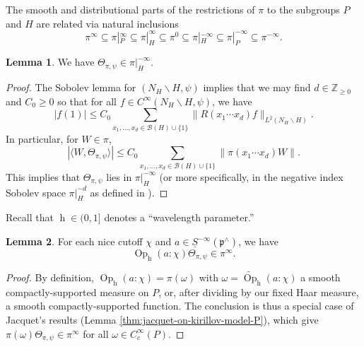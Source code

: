 \documentclass[reqno]{amsart}
\DeclareMathOperator{\h}{h}
\DeclareMathOperator{\Opp}{Op}
\theoremstyle{plain} \newtheorem{theorem} {Theorem}
\theoremstyle{definition} \newtheorem{definition} [theorem] {Definition}
\theoremstyle{itplain} %
\newtheorem{lemma}[theorem]{Lemma}
\numberwithin{equation}{section}
\numberwithin{theorem}{section}
\renewcommand{\geq}{\geqslant}
\renewcommand{\leq}{\leqslant}
\begin{document}
The smooth and distributional parts of the restrictions of $\pi$ to the subgroups $P$ and $H$ are related via natural inclusions
\begin{equation*}
  \pi^\infty \subseteq \pi|_P^\infty \subseteq \pi|_H^\infty \subseteq \pi ^0  \subseteq \pi|_H^{-\infty}
  \subseteq \pi|_P^{-\infty} \subseteq \pi^{-\infty}.
\end{equation*}
\begin{lemma}
  We have $\Theta_{\pi,\psi} \in \pi|_H^{-\infty}$.
\end{lemma}
\begin{proof}
  The Sobolev lemma for $(N_H \backslash H,\psi)$ implies that we may find $d \in \mathbb{Z}_{\geq 0}$ and $C_0 \geq 0$ so that for all $f \in C^\infty(N_H \backslash H, \psi)$, we have
  \begin{equation*}
    |f(1)| \leq C_0 \sum _{x_1, \dotsc, x_d \in \mathcal{B}(H) \cup \{1\}} \|R(x_1 \dotsb x_d) f\|_{L^2(N_H \backslash H)}.
  \end{equation*}
  In particular, for $W \in \pi$,
  \begin{equation*}
    |\langle W, \Theta_{\pi,\psi} \rangle| \leq C_0  \sum _{x_1, \dotsc, x_d \in \mathcal{B}(H) \cup \{1\}} \|\pi(x_1 \dotsb x_d) W\|.
  \end{equation*}
  This implies that $\Theta_{\pi,\psi}$ lies in $\pi|_H^{-\infty}$ (or more specifically, in the negative index Sobolev space $\pi|_H^{-d}$ as defined in \cite[\S3.2]{nelson-venkatesh-1}).
\end{proof}

Recall that $\h \in (0,1]$ denotes a ``wavelength parameter.''

\begin{lemma}
  For each nice cutoff $\chi$ and $a \in \underline{S}^{-\infty}(\mathfrak{p}^\wedge)$, we have
  \begin{equation*}
    \Opp_{\h}(a:\chi) \Theta_{\pi,\psi} \in \pi^\infty.
  \end{equation*}
\end{lemma}
\begin{proof}
  By definition, $\Opp_{\h}(a:\chi) = \pi(\omega)$ with $\omega = \widetilde{\Opp}_{\h}(a:\chi)$ a smooth compactly-supported measure on $P$, or, after dividing by our fixed Haar measure, a smooth compactly-supported function.  The conclusion is thus a special case of Jacquet's results (Lemma \ref{thm:jacquet-on-kirillov-model-P}), which give $\pi(\omega) \Theta_{\pi,\psi} \in \pi^\infty$ for all $\omega \in C_c^\infty(P)$.
\end{proof}
\end{document}
